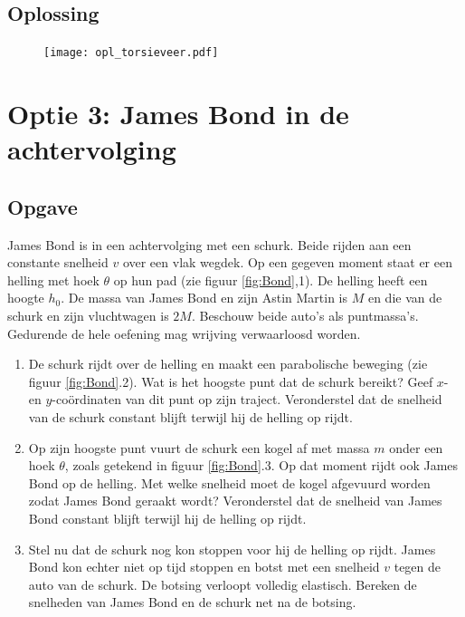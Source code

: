 \documentclass[a4paper,11pt]{article}
\begin{document}
\subsection*{Oplossing}
\begin{figure}[H] 
    \centering
        \texttt{[image: opl\_torsieveer.pdf]}

\end{figure}

\newpage 
\section*{Optie 3: James Bond in de achtervolging}
\subsection*{Opgave}
James Bond is in een achtervolging met een schurk. Beide rijden aan een constante snelheid $v$ over een vlak wegdek. Op een gegeven moment staat er een helling met hoek $\theta$ op hun pad (zie figuur \ref{fig:Bond},1). De helling heeft een hoogte $h_0$. De massa van James Bond en zijn Astin Martin is $M$ en die van de schurk en zijn vluchtwagen is $2M$. Beschouw beide auto's als puntmassa's. Gedurende de hele oefening mag wrijving verwaarloosd worden.
\begin{enumerate}[label=(\alph*)]
    \item De schurk rijdt over de helling en maakt een parabolische beweging (zie figuur \ref{fig:Bond}.2). Wat is het hoogste punt dat de schurk bereikt? Geef $x$- en $y$-coördinaten van dit punt op zijn traject. Veronderstel dat de snelheid van de schurk constant blijft terwijl hij de helling op rijdt.
    \item Op zijn hoogste punt vuurt de schurk een kogel af met massa $m$ onder een hoek $\theta$, zoals getekend in figuur \ref{fig:Bond}.3. Op dat moment rijdt ook James Bond op de helling. Met welke snelheid moet de kogel afgevuurd worden zodat James Bond geraakt wordt? Veronderstel dat de snelheid van James Bond constant blijft terwijl hij de helling op rijdt.
    \item Stel nu dat de schurk nog kon stoppen voor hij de helling op rijdt. James Bond kon echter niet op tijd stoppen en botst met een snelheid $v$ tegen de auto van de schurk. De botsing verloopt volledig elastisch. Bereken de snelheden van James Bond en de schurk net na de botsing. 
\end{enumerate}
\end{document}
